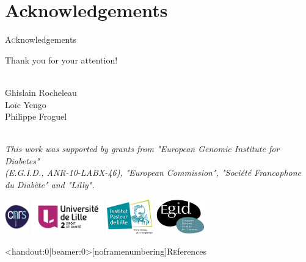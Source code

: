 \section{Acknowledgements}
\begin{frame}{\lettrine{A}cknowledgements}
\begin{center}
    \vspace{0.5cm}
    {\huge\par{Thank you for your attention!}}
    \vspace{0.75cm}
    {\scriptsize
        \par{%
            \\
            Ghislain Rocheleau\\
            Loïc Yengo\\
            Philippe Froguel\\
        }
        \vspace{1cm}
        \par{%
        \begin{singlespace*}
            \par{\\
                \textit{
                    This work was supported by grants from "European Genomic Institute for Diabetes"\\
                    (E.G.I.D., ANR-10-LABX-46), "European Commission", "Société Francophone du Diabète" and "Lilly".
                }
            }
        \end{singlespace*}
        }
        \vspace{0.75cm}
        \par{%
            \includegraphics[height=1.5cm, keepaspectratio]{../UTILS/Logos/logo_cnrs.pdf}\hspace{1cm}
            \includegraphics[height=1.5cm, keepaspectratio]{../UTILS/Logos/UL2-WEB-2014.png}\hspace{1cm}
            \includegraphics[height=1.5cm, keepaspectratio]{../UTILS/Logos/Institut-Pasteur-de-Lille.png}\hspace{1cm}
            \includegraphics[height=1.5cm, keepaspectratio]{../UTILS/Logos/logo_egid.pdf}%
        }
    }
\end{center}
\end{frame}

\begin{frame}<handout:0|beamer:0>[noframenumbering]{\lettrine{R}eferences}
    
\end{frame}

